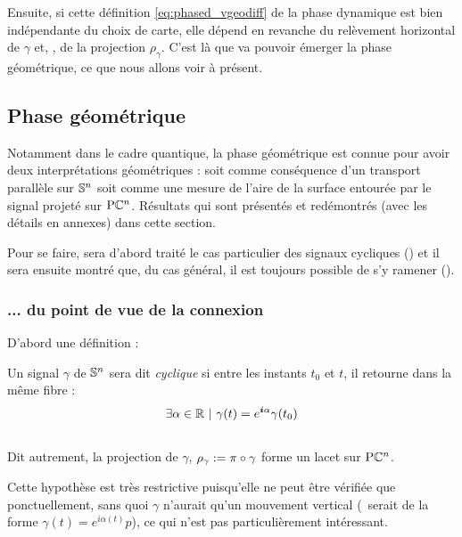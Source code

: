 Ensuite, si cette définition \eqref{eq:phased_vgeodiff} de la phase dynamique est bien indépendante du choix de carte, elle dépend en revanche du relèvement horizontal de $\gamma$ et, \afortiori, de la projection $\rho_\gamma$. C'est là que va pouvoir émerger la phase géométrique, ce que nous allons voir à présent.
\\



\subsection{Phase géométrique}

Notamment dans le cadre quantique, la phase géométrique est connue pour avoir deux interprétations géométriques \cite{bohm_geometric_2003, chruscinski_geometric_2004,faure_introduction_2022} : soit comme conséquence d'un transport parallèle sur $\S{n}$ soit comme une mesure de l'aire de la surface entourée par le signal projeté sur $\PC{n}$. Résultats qui sont présentés et redémontrés (avec les détails en annexes) dans cette section.

Pour se faire, sera d'abord traité le cas particulier des signaux cycliques () et il sera ensuite montré que, du cas général, il est toujours possible de s'y ramener ().
\skipl



\subsubsection{... du point de vue de la connexion} \label{subsec:phase_g2cycl}

D'abord une définition :

\begin{definition} \label{def:traj_cycl}
	Un signal $\gamma$ de $\S{n}$ sera dit \emph{cyclique} si entre les instants $t_0$ et $t$, il retourne dans la même fibre :
	\begin{equation}\label{eq:def2cycl}
		\exists \alpha \in\R\ |\ \gamma(t) = e^{\i \alpha}\gamma(t_0)
	\end{equation}
	\\
	Dit autrement, la projection de $\gamma$, $\rho_\gamma \defeq \pi\circ\gamma$ forme un lacet sur $\PC{n}$.
\end{definition}
Cette hypothèse est très restrictive puisqu'elle ne peut être vérifiée que ponctuellement, sans quoi $\gamma$ n'aurait qu'un mouvement vertical (\ie~serait de la forme $\gamma(t) = e^{i\alpha(t)}p$), ce qui n'est pas particulièrement intéressant.
\\

